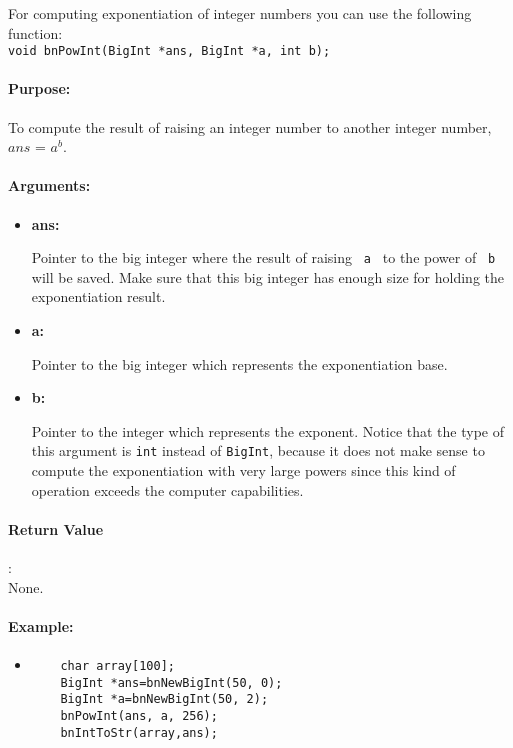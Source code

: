 \documentclass{book}
\begin{document}
For computing exponentiation of integer numbers you can use the following function:\\

\verb+void bnPowInt(BigInt *ans, BigInt *a, int b);+\\

\paragraph{Purpose:} 

To compute the result of raising an integer number to another integer number, $ans$ =  $a^b$.

\paragraph{Arguments:}

\begin{itemize}
\item{\bf ans:}

Pointer to the big integer where the result of raising \verb+ a + to the power of \verb+ b + will be saved. Make sure that this big integer has enough size for holding the exponentiation result.

\item {\bf a:}

Pointer to the big integer which represents the exponentiation base. 

\item {\bf b:}

Pointer to the integer which represents the exponent. Notice that the type of this argument is \verb+int+ instead of \verb+BigInt+, because it does not make sense to compute the exponentiation with very large powers since this kind of operation exceeds the computer capabilities.

\end{itemize}

\paragraph{Return Value}:\\

None.

\paragraph{Example:}

\begin{itemize}
\item
\begin{verbatim}
    char array[100];
    BigInt *ans=bnNewBigInt(50, 0);
    BigInt *a=bnNewBigInt(50, 2);
    bnPowInt(ans, a, 256);
    bnIntToStr(array,ans);
\end{verbatim}
\end{itemize}
\end{document}
